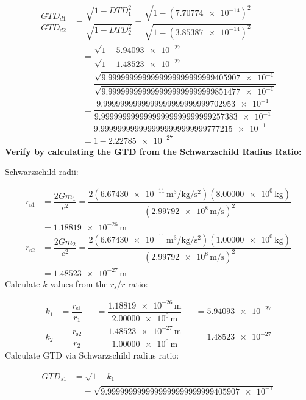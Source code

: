 \documentclass[twoside,twocolumn,9pt,fleqn]{article}
\begin{document}
\begin{mdframed}
\begin{align*}
\dfrac{GTD_{d1}}{GTD_{d2}} &= \dfrac{\sqrt{1-DTD_1^2}}{\sqrt{1-DTD_2^2}} = \dfrac{\sqrt{1-(\num{7.70774e-14})^2}}{\sqrt{1-(\num{3.85387e-14})^2}}\\
&\quad = \dfrac{\sqrt{1-\num{5.94093e-27}}}{\sqrt{1-\num{1.48523e-27}}}\\
&\quad = \dfrac{\sqrt{\num{9.9999999999999999999999999405907e-1}}}{\sqrt{\num{9.9999999999999999999999999851477e-1}}}\\
&\quad = \dfrac{\num{9.9999999999999999999999999702953e-1}}{\num{9.99999999999999999999999999257383e-1}}\\
&\quad = \num{9.9999999999999999999999999777215e-1}\\
&\quad = 1-\num{2.22785e-27}
\end{align*}
\noindent\textbf{Verify by calculating the GTD from the Schwarzschild Radius Ratio:}\par
\noindent Schwarzschild radii:\par
\begin{align*}
r_{\mathrm{s}1} &= \dfrac{2Gm_1}{c^2} = \dfrac{2(\num{6.67430e-11}\,\unit{\meter\cubed\per\kilogram\per\second\squared})(\num{8.00000e0}\,\unit{\kilogram})}{(\num{2.99792e8}\,\unit{\meter\per\second})^2}\\
&= \num{1.18819e-26}\,\unit{\meter}\\
r_{\mathrm{s}2} &= \dfrac{2Gm_2}{c^2} = \dfrac{2(\num{6.67430e-11}\,\unit{\meter\cubed\per\kilogram\per\second\squared})(\num{1.00000e0}\,\unit{\kilogram})}{(\num{2.99792e8}\,\unit{\meter\per\second})^2}\\
&= \num{1.48523e-27}\,\unit{\meter}
\end{align*}
\noindent Calculate $k$ values from the $r_{\mathrm{s}}/r$ ratio:\par
\begin{align*}
k_1 &= \dfrac{r_{\mathrm{s}1}}{r_1} &&= \dfrac{\num{1.18819e-26}\,\unit{\meter}}{\num{2.00000e0}\,\unit{\meter}} &&= \num{5.94093e-27}\\
k_2 &= \dfrac{r_{\mathrm{s}2}}{r_2} &&= \dfrac{\num{1.48523e-27}\,\unit{\meter}}{\num{1.00000e0}\,\unit{\meter}} &&= \num{1.48523e-27}
\end{align*}
\noindent Calculate GTD via Schwarzschild radius ratio:\par
\begin{align*}
GTD_{s1} &= \sqrt{1-k_1}\\
&\quad = \sqrt{\num{9.9999999999999999999999999405907e-1}}\\

\end{align*}
\end{mdframed}
\end{document}
